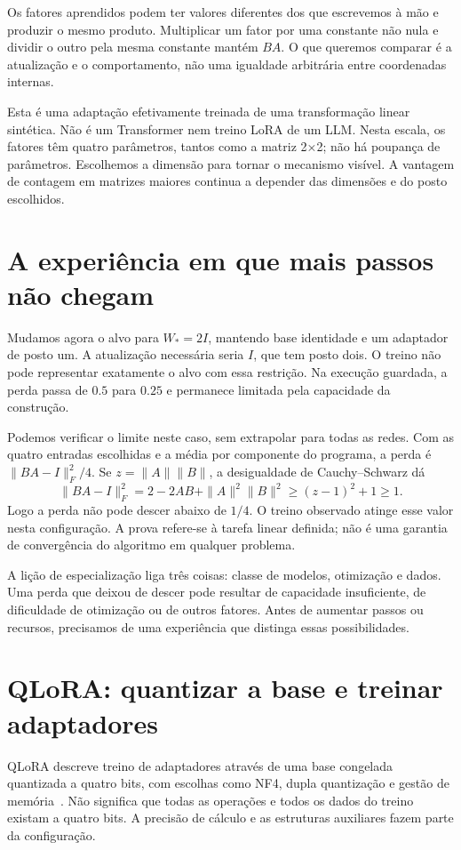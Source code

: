 Os fatores aprendidos podem ter valores diferentes dos que escrevemos à mão e produzir o mesmo produto. Multiplicar um fator por uma constante não nula e dividir o outro pela mesma constante mantém $BA$. O que queremos comparar é a atualização e o comportamento, não uma igualdade arbitrária entre coordenadas internas.

Esta é uma adaptação efetivamente treinada de uma transformação linear sintética. Não é um Transformer nem treino LoRA de um LLM. Nesta escala, os fatores têm quatro parâmetros, tantos como a matriz 2×2; não há poupança de parâmetros. Escolhemos a dimensão para tornar o mecanismo visível. A vantagem de contagem em matrizes maiores continua a depender das dimensões e do posto escolhidos.

\section{A experiência em que mais passos não chegam}
Mudamos agora o alvo para $W_*=2I$, mantendo base identidade e um adaptador de posto um. A atualização necessária seria $I$, que tem posto dois. O treino não pode representar exatamente o alvo com essa restrição. Na execução guardada, a perda passa de $0.5$ para $0.25$ e permanece limitada pela capacidade da construção.

Podemos verificar o limite neste caso, sem extrapolar para todas as redes. Com as quatro entradas escolhidas e a média por componente do programa, a perda é $\|BA-I\|_F^2/4$. Se $z=\|A\|\|B\|$, a desigualdade de Cauchy--Schwarz dá
\[
\|BA-I\|_F^2=2-2A B+\|A\|^2\|B\|^2
\geq (z-1)^2+1\geq1.
\]
Logo a perda não pode descer abaixo de $1/4$. O treino observado atinge esse valor nesta configuração. A prova refere-se à tarefa linear definida; não é uma garantia de convergência do algoritmo em qualquer problema.

A lição de especialização liga três coisas: classe de modelos, otimização e dados. Uma perda que deixou de descer pode resultar de capacidade insuficiente, de dificuldade de otimização ou de outros fatores. Antes de aumentar passos ou recursos, precisamos de uma experiência que distinga essas possibilidades.

\section{QLoRA: quantizar a base e treinar adaptadores}
QLoRA descreve treino de adaptadores através de uma base congelada quantizada a quatro bits, com escolhas como NF4, dupla quantização e gestão de memória~\citep{dettmers2023}. Não significa que todas as operações e todos os dados do treino existam a quatro bits. A precisão de cálculo e as estruturas auxiliares fazem parte da configuração.

